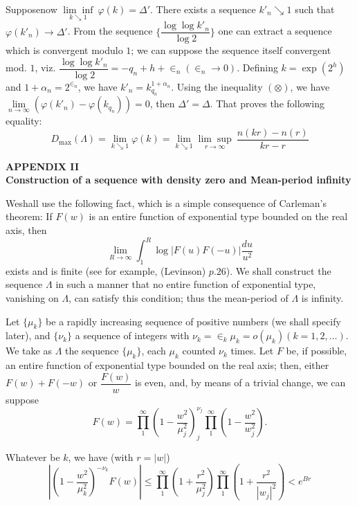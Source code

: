 Suppose\pageoriginale now $\underset{k \searrow 1}{\lim \inf} ~ \varphi (k)=
\Delta'$. There exists a sequence $k'_n \searrow 1$ such that
$\varphi (k'_n) \to \Delta'$. From the sequence $\Bigg\{ \dfrac{\log
 \log k'_n}{\log 2}\Bigg\}$ one can extract a sequence which is
convergent modulo $1$; we can suppose the sequence itself convergent
mod. $1$, viz. $\dfrac{\log \log k'_n}{\log 2}= -q_n + h+
\in_n (\in_n \to 0) $. Defining $k= \exp (2^h)$ and
$1+\alpha_n = 2^{\in_n}$, we have $ k'_n=
k^{1+\alpha_n}_{q_n}$. Using the inequality $(\otimes)$, we have
$\underset{n \to \infty}{\lim} (\varphi(k'_n)- \varphi(k_{q_n}))=0$,
then $\Delta' = \Delta$. That proves the following equality: 
$$
D_{\max}(\Lambda) =\lim\limits_{k \searrow 1 } \varphi
(k)=\lim\limits_{k \searrow 1 } \underset{r \to \infty}{\lim \sup} ~
\frac{n(kr)- n(r)}{kr-r} 
$$
\newpage

\begin{center}
  \textbf{\Large APPENDIX II} \\ 
  \textbf{\large Construction of a sequence with density zero
    and Mean-period infinity }
\end{center}

We\pageoriginale shall use the following fact, which is a simple consequence of
Carleman's theorem: If $F(w)$ is an entire function of exponential
type bounded on the real axis, then 
\begin{equation}
 \lim_{R \to \infty} \int^R_1 \log | F (u) F(-u) | \frac{du}{u^2} \tag{*}
\end{equation}
exists and is finite (see for example, (Levinson) $p.26$). We shall
construct the sequence $\Lambda$ in such a manner that no entire
function of exponential type, vanishing on $\Lambda$, can satisfy this
condition; thus the mean-period of $\Lambda$ is infinity. 

Let $\{ \mu_k \}$ be a rapidly increasing sequence of positive numbers
(we shall specify later), and $\{ \nu_k \}$ a sequence of integers
with $\nu_k=\in_k \mu_k=o(\mu_k)(k=1, 2, \ldots)$. We take as
$\Lambda$ the sequence $\{ \mu_k\}$, each $\mu_k$ counted $\nu_k$
times. Let $F$ be, if possible, an entire function of exponential type
bounded on the real axis; then, either $F(w)+ F(-w)$ or
$\dfrac{F(w)}{w}$ is even, and, by means of a trivial change, we can
suppose 
$$
F(w) = \prod^\infty_1 \left(1-\frac{w^2}{\mu_j^2}\right)^{\nu_j}_{j}
\prod^\infty_1 \left(1-\frac{w^2}{w^2_j}\right). 
$$

Whatever be $k$, we have (with $r=|w|$)
$$
|\left(1- \frac{w^2}{\mu^2_k}\right)^{-\nu_k} F(w)| \le \prod^\infty_1
\left(1+\frac{r^2}{\mu^2_j}\right) \prod^\infty_1
\left(1+\frac{r^2}{|w_j|^2}\right)<e^{Br} 
$$

